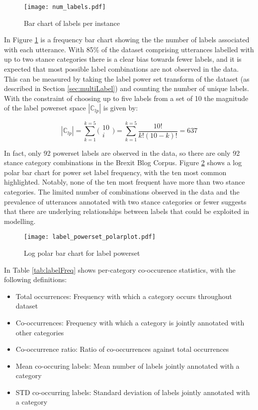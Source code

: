\documentclass[Dissertation.tex]{subfiles}
\begin{document}
\begin{figure}
	\centering
	\texttt{[image: num\_labels.pdf]}
	\caption{Bar chart of labels per instance}
	\label{fig:numLabels}
\end{figure}

In Figure \ref{fig:numLabels} is a frequency bar chart showing the  the number of labels associated with each utterance. With 85\% of the dataset comprising utterances labelled with up to two stance categories there is a clear bias towards fewer labels, and it is expected that most possible label combinations are not observed in the data. This can be measured by taking the label power set transform of the dataset (as described in Section \ref{sec:multiLabel}) and counting the number of unique labels. With the constraint of choosing up to five labels from a set of 10 the magnitude of the label powerset space $ |\mathbb{C}_{lp}| $ is given by:

\[ |\mathbb{C}_{lp}| = \sum_{k=1}^{k=5}\bigg( 		\begin{array}{c}
10\\
i
\end{array} \bigg) = \sum_{k=1}^{k=5}\frac{10!}{k!(10-k)!} = 637 \]


In fact, only 92 powerset labels are observed in the data, so there are only 92 stance category combinations in the Brexit Blog Corpus. Figure \ref{fig:polarBarChart} shows a log polar bar chart for power set label frequency, with the ten most common highlighted. Notably, none of the ten most frequent have more than two stance categories. The limited number of combinations observed in the data and the prevalence of utterances annotated with two stance categories or fewer suggests that there are underlying relationships between labels that could be exploited in modelling.
\begin{figure}
	\centering
	
	\texttt{[image: label\_powerset\_polarplot.pdf]}
	\caption{Log polar bar chart for label powerset}
	\label{fig:polarBarChart}
\end{figure}


In Table \ref{tab:labelFreq} shows per-category co-occurence statistics, with the following definitions: \begin{itemize}
	\item Total occurrences: Frequency with which a category occurs throughout dataset
	\item Co-occurrences: Frequency with which a category is jointly annotated with other categories
	
	\item Co-occurrence ratio: Ratio of co-occurrences against total occurrences
	\item Mean co-occuring labels: Mean number of labels jointly annotated with a category
	\item  STD co-occurring labels: Standard deviation of labels jointly annotated with a category
\end{itemize}
\end{document}
